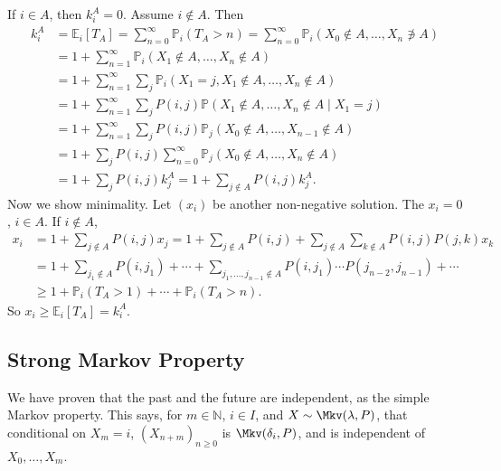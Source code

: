 \documentclass[12pt]{article}
\begin{document}
\begin{proofbox}
	If $i \in A$, then $k_i^{A} = 0$. Assume $i \not \in A$. Then
\begin{align*}
	k_i^{A} &= \mathbb{E}_i[T_A] = \sum_{n = 0}^{\infty} \mathbb{P}_i (T_A > n) = \sum_{n = 0}^{\infty}\mathbb{P}_i(X_0 \not \in A, \ldots, X_n \not \ni A) \\
		&= 1 + \sum_{n = 1}^{\infty} \mathbb{P}_i(X_1 \not \in A, \ldots, X_n \not \in A) \\
		&= 1 + \sum_{n = 1}^{\infty} \sum_{j} \mathbb{P}_i(X_1 = j, X_1 \not \in A, \ldots, X_n \not \in A) \\
		&= 1 + \sum_{n = 1}^{\infty} \sum_{j} P(i, j) \mathbb{P}(X_1 \not \in A, \ldots, X_n \not \in A \mid X_1 = j) \\
		&= 1 + \sum_{n = 1}^{\infty} \sum_{j} P(i, j) \mathbb{P}_j(X_0 \not \in A, \ldots, X_{n-1} \not \in A) \\
		&= 1 + \sum_{j} P(i, j) \sum_{n = 0}^{\infty} \mathbb{P}_j(X_0 \not \in A, \ldots, X_n \not \in A) \\
		&= 1 + \sum_{j}P(i,j) k_j^{A} = 1 + \sum_{j \not \in A}P(i, j) k_{j}^{A}.
\end{align*}
Now we show minimality. Let $(x_i)$ be another non-negative solution. The $x_i = 0$, $i \in A$. If $i \not \in A$,
\begin{align*}
	x_i &= 1 + \sum_{j \not \in A}P(i, j) x_j = 1 + \sum_{j \not \in A}P(i, j) + \sum_{j \not \in A}\sum_{k \not \in A}P(i, j) P(j, k) x_k \\
	    &=1 + \sum_{j_1 \not \in A}P(i, j_1) + \cdots + \sum_{j_1, \ldots, j_{n-1} \not \in A} P(i, j_1) \cdots P(j_{n-2}, j_{n-1}) + \cdots \\
	    &\geq 1 + \mathbb{P}_i(T_A > 1) + \cdots + \mathbb{P}_i(T_A > n).
\end{align*}
So $x_i \geq \mathbb{E}_i[T_A] = k_i^{A}$.
\end{proofbox}

\subsection{Strong Markov Property}%
\label{sub:strong_markov_property}

We have proven that the past and the future are independent, as the simple Markov property. This says, for $m \in \mathbb{N}$, $i \in I$, and $X \sim \Mkv(\lambda, P)$, that conditional on $X_m = i$, $(X_{n+m})_{n \geq 0}$ is $\Mkv(\delta_i, P)$, and is independent of $X_0, \ldots, X_m$.
\end{document}
